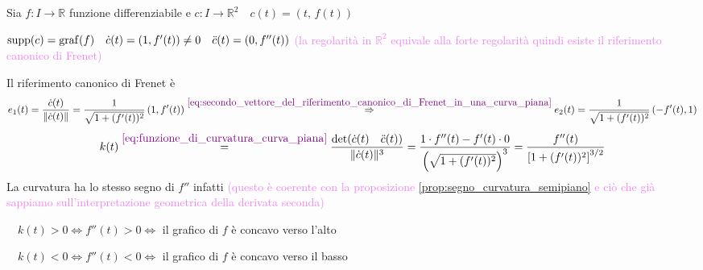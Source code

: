         \begin{esempio}
        Sia $f \colon I \to \mathbb{R}$ funzione differenziabile e $c \colon I \to \mathbb{R}^2 \quad c(t)=\left( t, \, f(t) \right)$ 

        $\operatorname{supp}(c)=\operatorname{graf}(f) \quad \dot{c}(t)= \left(1, f'(t)\right) \neq 0 \quad \ddot{c}(t) = \left(0, f''(t)\right)$ 
        \textcolor{violet}{(la regolarità in $\mathbb{R}^2$ equivale alla forte regolarità quindi esiste il riferimento canonico di Frenet)}

        Il riferimento canonico di Frenet è 
        \[ e_1(t) = \frac{\dot{c}(t)}{\lVert\dot{c}(t)\rVert} = \frac{1}{\sqrt{1 + (f'(t))^2}} \left(1, f'(t)\right) \overset{\textcolor{violet}{\eqref{eq:secondo_vettore_del_riferimento_canonico_di_Frenet_in_una_curva_piana}}}{\Rightarrow} e_2(t) =  \frac{1}{\sqrt{1 + (f'(t))^2}} \left( -f'(t), 1 \right) \]
        \[ k(t) \overset{\textcolor{violet}{\eqref{eq:funzione_di_curvatura_curva_piana}}}{=} \frac{\det(\dot{c}(t) \quad \ddot{c}(t))}{\lVert\dot{c}(t)\rVert^3} = \frac{1 \cdot f''(t) - f'(t) \cdot 0}{\left( \sqrt{1 + (f'(t))^2} \right)^{3}} = \frac{f''(t)}{\left[ 1 + (f'(t))^2 \right]^{3/2}} \]
        La curvatura ha lo stesso segno di $f''$ infatti \textcolor{violet}{(questo è coerente con la proposizione \ref{prop:segno_curvatura_semipiano} e ciò 
        che già sappiamo sull'interpretazione geometrica della derivata seconda)}

        $\quad k(t) >0 \iff f''(t) > 0 \iff$ il grafico di $f$ è concavo verso l'alto 

        $\quad k(t) <0 \iff f''(t) < 0 \iff$ il grafico di $f$ è concavo verso il basso
        \begin{center}
\end{center}
\end{esempio}

